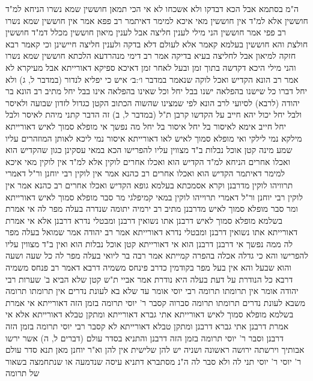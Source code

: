 \documentclass[12pt, openany]{book}
\begin{document}
{ה"מ בסתמא אבל הכא דבדקו ולא אשכחו לא 
אי הכי תמאן חוששין שמא נשרו 
הניחא למ"ד חוששין אלא למ"ד אין חוששין מאי איכא למימר דאיתמר רב פפא אמר אין חוששין שמא נשרו רב פפי אמר חוששין הני מילי לענין חליצה אבל לענין מיאון חוששין 
מכלל דמ"ד חוששין חולצת והא חוששין בעלמא קאמר 
אלא לעולם דלא בדקה ולענין חליצה חיישינן וכי קאמר רבא חזקה למיאון אבל לחליצה בעיא בדיקה 
אמר רב דימי מנהרדעא הלכתא חוששין שמא נשרו 
והני מילי היכא דקדשה בתוך זמן ובעל לאחר זמן דאיכא ספיקא דאורייתא אבל מעיקרא לא 
אמר רב הונא הקדיש ואכל לוקה
שנאמר {במדבר ו׳:ב׳ } איש כי יפליא לנדור (במדבר ל, ג) ולא יחל דברו כל שישנו בהפלאה ישנו בבל יחל וכל שאינו בהפלאה אינו בבל יחל 
מתיב רב הונא בר יהודה (לרבא) לסיועי לרב הונא
לפי שמצינו שהשוה הכתוב הקטן כגדול לזדון שבועה ולאיסר ולבל יחל יכול יהא חייב על הקדשו קרבן 
ת"ל (במדבר ל, ב) זה הדבר 
קתני מיהת לאיסר ולבל יחל חייב אימא לאיסור בל יחל 
איסור בל יחל מה נפשך אי מופלא סמוך לאיש דאורייתא מילקא נמי לילקי ואי מופלא סמוך לאיש לאו דאורייתא איסור נמי ליכא לאותן המוזהרים עליו 
שמע מינה קטן אוכל נבלות ב"ד מצווין עליו להפרישו הכא במאי עסקינן כגון שהקדיש הוא ואכלו אחרים 
הניחא למ"ד הקדיש הוא ואכלו אחרים לוקין אלא למ"ד אין לוקין מאי איכא למימר דאיתמר הקדיש הוא ואכלו אחרים רב כהנא אמר אין לוקין רבי יוחנן ור"ל דאמרי תרוויהו לוקין 
מדרבנן וקרא אסמכתא בעלמא 
גופא הקדיש ואכלו אחרים רב כהנא אמר אין לוקין רבי יוחנן ור"ל דאמרי תרוייהו לוקין במאי קמיפלגי מר סבר מופלא סמוך לאיש דאורייתא ומר סבר מופלא סמוך לאיש מדרבנן 
מתיב רב ירמיה יתומה שנדרה בעלה מפר לה אי אמרת בשלמא מופלא סמוך לאיש דרבנן אתו נשואין דרבנן ומבטלי נדרא דרבנן אלא אי אמרת דאורייתא אתו נשואין דרבנן ומבטלי נדרא דאורייתא 
אמר רב יהודה אמר שמואל בעלה מפר לה ממה נפשך אי דרבנן דרבנן הוא אי דאורייתא קטן אוכל נבלות הוא ואין ב"ד מצווין עליו להפרישו 
והא כי גדלה אכלה בהפרה קמייתא 
אמר רבה בר ליואי בעלה מפר לה כל שעה ושעה והוא שבעל 
והא אין בעל מפר בקודמין כדרב פינחס משמיה דרבא דאמר רב פנחס משמיה דרבא כל הנודרת על דעת בעלה היא נודרת 
אמר אביי ת"ש קטן שלא הביא ב' שערות רבי יהודה אומר אין תרומתו תרומה רבי יוסי אומר עד שלא בא לעונת נדרים אין תרומתו תרומה משבא לעונת נדרים תרומתו תרומה 
סברוה קסבר ר' יוסי תרומה בזמן הזה דאורייתא אי אמרת בשלמא מופלא סמוך לאיש דאורייתא אתי גברא דאורייתא ומתקן טבלא דאורייתא אלא אי אמרת דרבנן אתי גברא דרבנן ומתקן טבלא דאורייתא לא קסבר רבי יוסי תרומה בזמן הזה דרבנן 
וסבר ר' יוסי תרומה בזמן הזה דרבנן והתניא בסדר עולם (דברים ל, ה) אשר ירשו אבותיך וירשתה
ירושה ראשונה ושניה יש להן שלישית אין להן 
וא"ר יוחנן מאן תנא סדר עולם ר' יוסי 
ר' יוסי תני לה ולא סבר לה ה"נ מסתברא דתניא עיסה שנדמעה או שנתחמצה בשאור של תרומה}
\end{document}
